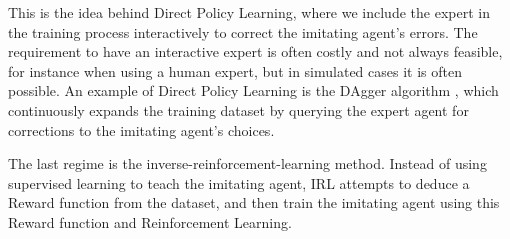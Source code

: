 This is the idea behind Direct Policy Learning,
where we include the expert in the training process interactively
to correct the imitating agent's errors.
The requirement to have an interactive expert is often costly and not always feasible,
for instance when using a human expert,
but in simulated cases it is often possible.
An example of Direct Policy Learning
is the DAgger algorithm \cite{dagger},
which continuously expands the training dataset
by querying the expert agent for corrections to the imitating agent's choices.

\begin{comment}
Direct Policy Learning
- interactive expert
- for each state s query expert to retrieve action a
  - supervised learning on (s, a)
- queries the expert on-demand to get labels for unseen scenarios during training
    - but still have to cause those scenarios to happen to actually train on them
- expert doesn't assume (s1, a1) to be independent from (s2, a2) - better planning
- variants:
    - DAGGER aggregates data into a big dataset which is trained on continuously
    - SEARN \& SMILe seems to only train on the latest sample

Inverse Reinforcement Learning
- learn a reward function $R$ from observed behaviour that maps states to a reward $R: (s, a) \rightarrow r$
- then do reinforcement learning using this reward function
- repeat 


\begin{enumerate}
    \item Behaviour Cloning - i.i.d. assumption not valid
    \item Direct Policy Learning, DAgger
    \item Adversarial Imitation / Inverse Reinforcement Learning
\end{enumerate}

\end{comment}

The last regime is the \acrfull{inverse-reinforcement-learning} method.
Instead of using supervised learning to teach the imitating agent,
IRL attempts to deduce a Reward function from the dataset,
and then train the imitating agent using this Reward function and Reinforcement Learning.

